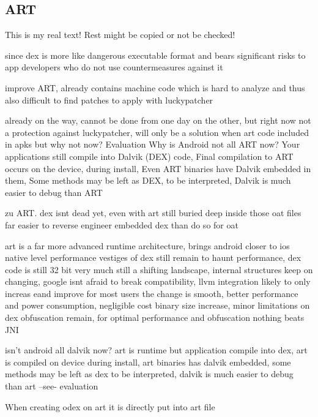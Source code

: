 \subsection{ART} \label{section:counter-external-art}
This is my real text! Rest might be copied or not be checked!

since dex is more like dangerous executable format and bears significant risks to app developers who do not use countermeasures against it

improve ART, already contains machine code which is hard to analyze and thus also difficult to find patches to apply with luckypatcher



already on the way, cannot be done from one day on the other, but right now not a protection against luckypatcher, will only be a solution when art code included in apks
but why not now?
%
Evaluation
Why is Android not all ART now? Your applications still compile into Dalvik (DEX) code, Final compilation to ART occurs on the device, during install, Even ART binaries have Dalvik embedded in them, Some methods may be left as DEX, to be interpreted, Dalvik is much easier to debug than ART\newline
\cite{andevconDalvikART}
%

%
zu ART.
dex isnt dead yet, even with art
still buried deep inside those oat files
far easier to reverse engineer embedded dex than do so for oat

art is a far more advanced runtime architecture, brings android closer to ios native level performance
vestiges of dex still remain to haunt performance, dex code is still 32 bit
very much still a shifting landscape, internal structures keep on changing, google isnt afraid to break compatibility, llvm integration likely to only increas eand improve
for most users the change is smooth, better performance and power consumption, negligible cost binary size increase, minor limitations on dex obfuscation remain, for optimal performance and obfuscation nothing beats JNI

isn't android all dalvik now?
art is runtime but application compile into dex, art is compiled on device during install, art binaries has dalvik embedded, some methods may be left as dex to be interpreted, dalvik is much easier to debug than art --see- evaluation \newline

When creating odex on art it is directly put into art file

\cite{andevconDalvikART}
%
